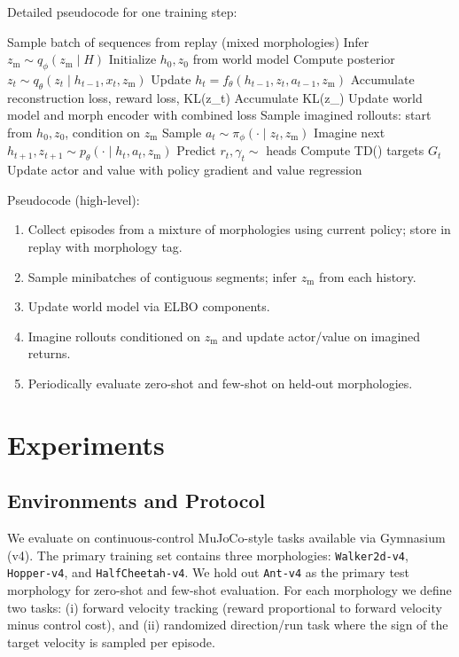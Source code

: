 \documentclass{article}
\begin{document}
Detailed pseudocode for one training step:
\begin{algorithmic}[1]
\State Sample batch of sequences from replay (mixed morphologies)
    \State Infer $z_{\mathrm{m}} \sim q_\phi(z_{\mathrm{m}} \mid H)$
    \State Initialize $h_0, z_0$ from world model
        \State Compute posterior $z_t \sim q_\theta(z_t \mid h_{t-1}, x_t, z_{\mathrm{m}})$
        \State Update $h_t = f_\theta(h_{t-1}, z_t, a_{t-1}, z_{\mathrm{m}})$
        \State Accumulate reconstruction loss, reward loss, KL(z_t)
    \EndFor
    \State Accumulate KL(z_{})
\EndFor
\State Update world model and morph encoder with combined loss
\State Sample imagined rollouts: start from $h_0, z_0$, condition on $z_{\mathrm{m}}$
    \State Sample $a_t \sim \pi_\phi(\cdot \mid z_t, z_{\mathrm{m}})$
    \State Imagine next $h_{t+1}, z_{t+1} \sim p_\theta(\cdot \mid h_t, a_t, z_{\mathrm{m}})$
    \State Predict $r_t, \gamma_t \sim$ heads
\EndFor
\State Compute TD(\lambda) targets $G_t$
\State Update actor and value with policy gradient and value regression
\end{algorithmic}
Pseudocode (high-level):
\begin{enumerate}
\item Collect episodes from a mixture of morphologies using current policy; store in replay with morphology tag.
\item Sample minibatches of contiguous segments; infer $z_{\mathrm{m}}$ from each history.
\item Update world model via ELBO components.
\item Imagine rollouts conditioned on $z_{\mathrm{m}}$ and update actor/value on imagined returns.
\item Periodically evaluate zero-shot and few-shot on held-out morphologies.
\end{enumerate}

\section{Experiments}
\subsection{Environments and Protocol}
We evaluate on continuous-control MuJoCo-style tasks available via Gymnasium (v4). The primary training set contains three morphologies: \texttt{Walker2d-v4}, \texttt{Hopper-v4}, and \texttt{HalfCheetah-v4}. We hold out \texttt{Ant-v4} as the primary test morphology for zero-shot and few-shot evaluation. For each morphology we define two tasks: (i) forward velocity tracking (reward proportional to forward velocity minus control cost), and (ii) randomized direction/run task where the sign of the target velocity is sampled per episode.
\end{document}
